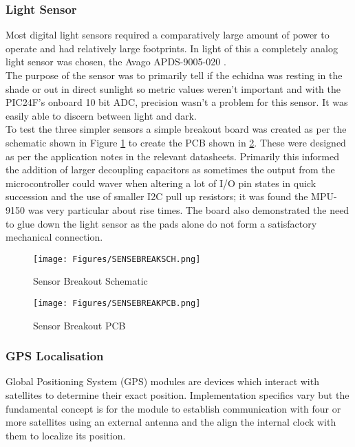 \documentclass[12pt,openany,a4paper]{book}
\begin{document}
			\subsubsection{Light Sensor}
			Most digital light sensors required a comparatively large amount of power to operate and had relatively large footprints. In light of this a completely analog light sensor was chosen, the Avago APDS-9005-020 \cite{AVAGOLIGHT}. \\
			
			The purpose of the sensor was to primarily tell if the echidna was resting in the shade or out in direct sunlight so metric values weren't important and with the PIC24F's onboard 10 bit ADC, precision wasn't a problem for this sensor. It was easily able to discern between light and dark. \\ 
			
			To test the three simpler sensors a simple breakout board was created as per the schematic shown in Figure \ref{fig:SENSEBREAKSCH} to create the PCB shown in \ref{fig:SENSEBREAKPCB}. These were designed as per the application notes in the relevant datasheets. Primarily this informed the addition of larger decoupling capacitors as sometimes the output from the microcontroller could waver when altering a lot of I/O pin states in quick succession and the use of smaller I2C pull up resistors; it was found the MPU-9150 was very particular about rise times. The board also demonstrated the need to glue down the light sensor as the pads alone do not form a satisfactory mechanical connection.
			
			\begin{figure}[H]
				\centering
				\texttt{[image: Figures/SENSEBREAKSCH.png]}
				\caption{Sensor Breakout Schematic}
				\label{fig:SENSEBREAKSCH}
			\end{figure}		
			
			\begin{figure}[H]
				\centering
				\texttt{[image: Figures/SENSEBREAKPCB.png]}
				\caption{Sensor Breakout PCB}
				\label{fig:SENSEBREAKPCB}
			\end{figure}		

			\subsubsection{GPS Localisation}
			Global Positioning System (GPS) modules are devices which interact with satellites to determine their exact position. Implementation specifics vary but the fundamental concept is for the module to establish communication with four or more satellites using an external antenna and the align the internal clock with them to localize its position. \\
						
\end{document}
